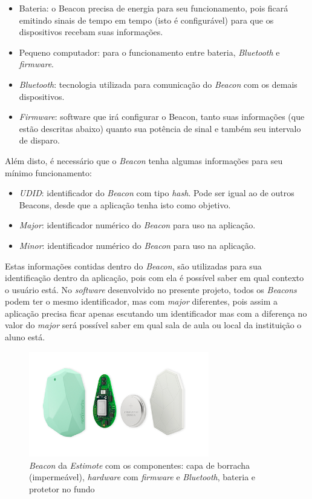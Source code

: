 \documentclass[
	12pt,
	oneside,
	a4paper,
	english,
	brazil,
]{abntex2}
\begin{document}
\begin{itemize}
    \item Bateria: o Beacon precisa de energia para seu funcionamento, pois ficará emitindo sinais de tempo em tempo (isto é configurável) para que os dispositivos recebam suas informações.
    \item Pequeno computador: para o funcionamento entre bateria, \emph{Bluetooth} e \emph{firmware}.
    \item \emph{Bluetooth}: tecnologia utilizada para comunicação do \emph{Beacon} com os demais dispositivos.
    \item \emph{Firmware}: software que irá configurar o Beacon, tanto suas informações (que estão descritas abaixo) quanto sua potência de sinal e também seu intervalo de disparo.
\end{itemize}

Além disto, é necessário que o \emph{Beacon} tenha algumas informações para seu mínimo funcionamento:

\begin{itemize}
    \item \emph{UDID}: identificador do \emph{Beacon} com tipo \emph{hash}. Pode ser igual ao de outros Beacons, desde que a aplicação tenha isto como objetivo.
    \item \emph{Major}: identificador numérico do \emph{Beacon} para uso na aplicação.
    \item \emph{Minor}: identificador numérico do \emph{Beacon} para uso na aplicação.
\end{itemize}

Estas informações contidas dentro do \emph{Beacon}, são utilizadas para sua identificação dentro da aplicação, pois com ela é possível saber em qual contexto o usuário está. No \emph{software} desenvolvido no presente projeto, todos os \emph{Beacons} podem ter o mesmo identificador, mas com \emph{major} diferentes, pois assim a aplicação precisa ficar apenas escutando um identificador mas com a diferença no valor do \emph{major} será possível saber em qual sala de aula ou local da instituição o aluno está.

\begin{figure}[h]
\centering
\includegraphics[width=0.7\textwidth]{estimote-beacon}
    \caption{
        \emph{Beacon} da \emph{Estimote} com os componentes: capa de borracha (impermeável), \emph{hardware} com \emph{firmware} e \emph{Bluetooth}, bateria e protetor no fundo
    }
\end{figure}
\end{document}
